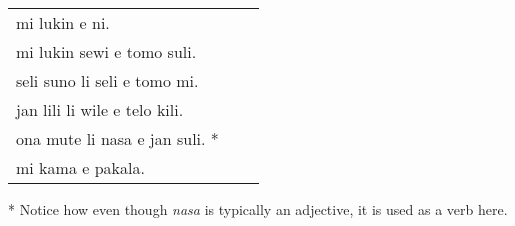 \begin{supertabular}{p{5,5cm}|ll}
    mi lukin e ni.                 &  & \\ %
    mi lukin sewi e tomo suli.     &  & \\ %
    seli suno li seli e tomo mi.   &  & \\ %
    jan lili li wile e telo kili.  &  & \\ %
    ona mute li nasa e jan suli. * &  & \\ %
    mi kama e pakala.              &  & \\ %
\end{supertabular}

* Notice how even though \textit{nasa} is typically an adjective, it is used as a verb here.
